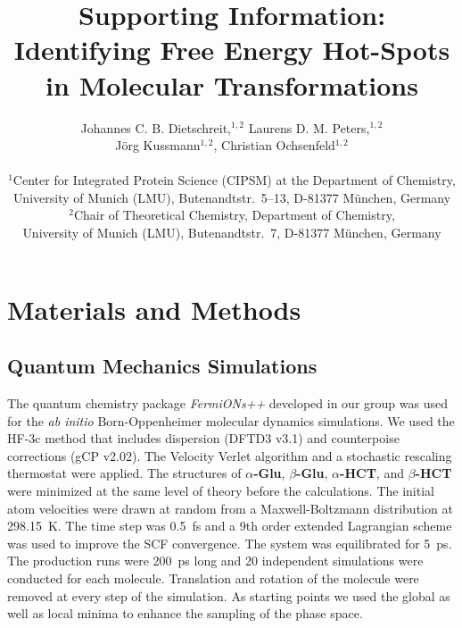 \documentclass[12pt, english, letter]{article}
\title{Supporting Information: \\ Identifying Free Energy Hot-Spots\\ in Molecular Transformations}
\author
{Johannes C. B. Dietschreit,$^{1,2}$ Laurens D. M. Peters,$^{1,2}$\\ J\"org Kussmann$^{1,2}$, Christian Ochsenfeld$^{1,2}$\\
	\\
	\normalsize{$^{1}$Center for Integrated Protein Science (CIPSM) at the Department of Chemistry,}\\
	\normalsize{University of Munich (LMU), Butenandtstr.~5--13, D-81377 M\"unchen, Germany}\\
	\normalsize{$^{2}$Chair of Theoretical Chemistry,  Department of Chemistry,}\\
	\normalsize{University of Munich (LMU), Butenandtstr.~7, D-81377 M\"unchen, Germany}\\
}
\date{}
\newcommand{\aglu}{\textbf{$\alpha$-Glu}}
\newcommand{\bglu}{\textbf{$\beta$-Glu}}
\newcommand{\ahct}{\textbf{$\alpha$-HCT}}
\newcommand{\bhct}{\textbf{$\beta$-HCT}}
\begin{document}
	
	\maketitle
	
	\renewcommand\figurename{SFigure}
	
	

\tableofcontents
	
	\section{Materials and Methods}
	
	\subsection{Quantum Mechanics Simulations}
	
	The quantum chemistry package \emph{FermiONs++}\autocite{Kussmann2013,Kussmann2015} developed in our group was used for the \textit{ab initio} Born-Oppenheimer molecular dynamics simulations. We used the HF-3c\autocite{Sure2013} method that includes dispersion (DFTD3 v3.1)\autocite{Grimme2010,Grimme2011} and counterpoise corrections (gCP v2.02)\autocite{Kruse2012}. The Velocity Verlet algorithm\autocite{Verlet1967,Swope1982} and a stochastic rescaling thermostat\autocite{Bussi2007} were applied. The structures of \aglu{}, \bglu{}, \ahct{}, and \bhct{} were minimized at the same level of theory before the calculations. The initial atom velocities were drawn at random from a Maxwell-Boltzmann distribution at 298.15~K. The time step was 0.5~fs and a 9th order extended Lagrangian scheme\autocite{Niklasson2009} was used to improve the SCF convergence. The system was equilibrated for 5~ps. The production runs were 200~ps long and 20 independent simulations were conducted for each molecule. Translation and rotation of the molecule were removed at every step of the simulation. As starting points we used the global as well as local minima to enhance the sampling of the phase space.
	
\end{document}
